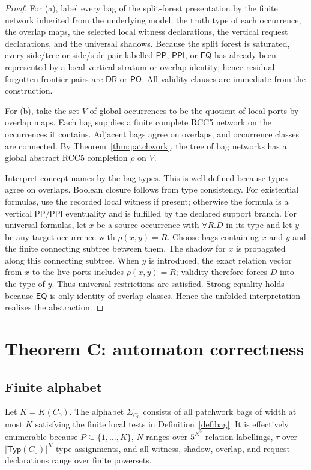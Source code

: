 \documentclass[11pt]{article}
\newcommand{\EQ}{\mathsf{EQ}}
\newcommand{\PP}{\mathsf{PP}}
\newcommand{\PPI}{\mathsf{PPI}}
\newcommand{\PO}{\mathsf{PO}}
\newcommand{\DR}{\mathsf{DR}}
\newcommand{\Typ}{\mathsf{Typ}}
\begin{document}
\begin{proof}
For (a), label every bag of the split-forest presentation by the finite network inherited from the underlying model, the truth type of each occurrence, the overlap maps, the selected local witness declarations, the vertical request declarations, and the universal shadows.  Because the split forest is saturated, every side/tree or side/side pair labelled $\PP$, $\PPI$, or $\EQ$ has already been represented by a local vertical stratum or overlap identity; hence residual forgotten frontier pairs are $\DR$ or $\PO$.  All validity clauses are immediate from the construction.

For (b), take the set $V$ of global occurrences to be the quotient of local ports by overlap maps.  Each bag supplies a finite complete RCC5 network on the occurrences it contains.  Adjacent bags agree on overlaps, and occurrence classes are connected.  By Theorem~\ref{thm:patchwork}, the tree of bag networks has a global abstract RCC5 completion $\rho$ on $V$.

Interpret concept names by the bag types.  This is well-defined because types agree on overlaps.  Boolean closure follows from type consistency.  For existential formulas, use the recorded local witness if present; otherwise the formula is a vertical $\PP/\PPI$ eventuality and is fulfilled by the declared support branch.  For universal formulas, let $x$ be a source occurrence with $\forall R.D$ in its type and let $y$ be any target occurrence with $\rho(x,y)=R$.  Choose bags containing $x$ and $y$ and the finite connecting subtree between them.  The shadow for $x$ is propagated along this connecting subtree.  When $y$ is introduced, the exact relation vector from $x$ to the live ports includes $\rho(x,y)=R$; validity therefore forces $D$ into the type of $y$.  Thus universal restrictions are satisfied.  Strong equality holds because $\EQ$ is only identity of overlap classes.  Hence the unfolded interpretation realizes the abstraction.
\end{proof}

\section{Theorem C: automaton correctness}

\subsection{Finite alphabet}

Let $K=K(C_0)$.  The alphabet $\Sigma_{C_0}$ consists of all patchwork bags of width at most $K$ satisfying the finite local tests in Definition~\ref{def:bag}.  It is effectively enumerable because $P\subseteq\{1,\ldots,K\}$, $N$ ranges over $5^{K^2}$ relation labellings, $\tau$ over $|\Typ(C_0)|^K$ type assignments, and all witness, shadow, overlap, and request declarations range over finite powersets.
\end{document}
